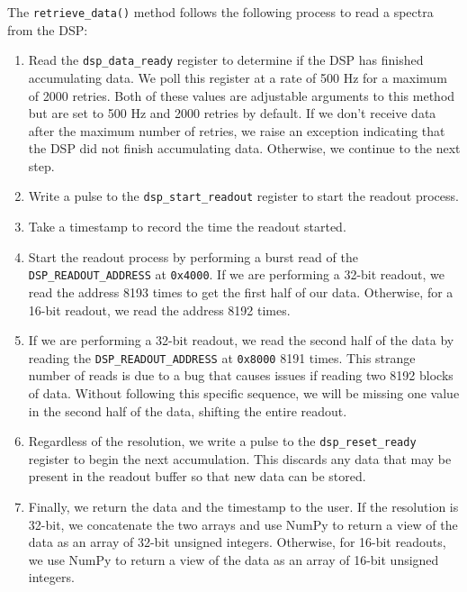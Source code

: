 The \texttt{retrieve\_data()} method follows the following process to read a spectra from the DSP:
\begin{enumerate}
    \item 
        Read the \texttt{dsp\_data\_ready} register to determine if the DSP has finished accumulating data.
        We poll this register at a rate of 500 Hz for a maximum of 2000 retries. 
        Both of these values are adjustable arguments to this method but are set to 500 Hz and 2000 retries by default.
        If we don't receive data after the maximum number of retries, we raise an exception indicating that the DSP did not finish accumulating data.
        Otherwise, we continue to the next step.
    \item 
        Write a pulse to the \texttt{dsp\_start\_readout} register to start the readout process. 
    \item  
        Take a timestamp to record the time the readout started.
    \item 
        Start the readout process by performing a burst read of the \texttt{DSP\_READOUT\_ADDRESS} at \texttt{0x4000}. 
        If we are performing a 32-bit readout, we read the address 8193 times to get the first half of our data. 
        Otherwise, for a 16-bit readout, we read the address 8192 times.
    \item 
        If we are performing a 32-bit readout, we read the second half of the data by reading the \texttt{DSP\_READOUT\_ADDRESS} at \texttt{0x8000} 8191 times.
        This strange number of reads is due to a bug that causes issues if reading two 8192 blocks of data.
        Without following this specific sequence, we will be missing one value in the second half of the data, shifting the entire readout. 
    \item 
        Regardless of the resolution, we write a pulse to the \texttt{dsp\_reset\_ready} register to begin the next accumulation.
        This discards any data that may be present in the readout buffer so that new data can be stored. 
    \item 
        Finally, we return the data and the timestamp to the user. 
        If the resolution is 32-bit, we concatenate the two arrays and use NumPy to return a view of the data as an array of 32-bit unsigned integers.
        Otherwise, for 16-bit readouts, we use NumPy to return a view of the data as an array of 16-bit unsigned integers.
\end{enumerate}

